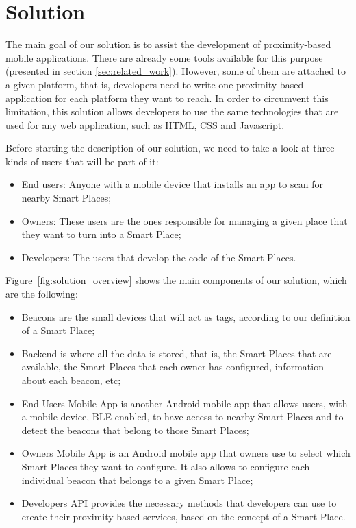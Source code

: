 
\section{Solution}
\label{sec:solution}
The main goal of our solution is to assist
the development of proximity-based mobile applications.
There are already some tools available for this purpose (presented in section \ref{sec:related_work}).
However, some of them are attached to a given platform, that is, developers
need to write one proximity-based application for each platform they want
to reach.
In order to circumvent this limitation, this solution allows developers
to use the same technologies that are used for any web application, such as \gls{HTML}, \gls{CSS} and Javascript.

Before starting the description of our solution, we need to take a look at three kinds of users that will be part of it:
\begin{itemize}
  \item End users: Anyone with a mobile device that installs an app to scan for nearby Smart Places;
  \item Owners: These users are the ones responsible for managing a given place that they want to turn into a Smart Place;
  \item Developers: The users that develop the code of the Smart Places.
\end{itemize}
Figure~\ref{fig:solution_overview} shows the main components of our solution, which are the following:
\begin{itemize}
  \item Beacons
  are the small devices that will act as tags, according to our definition of a Smart Place;
  \item Backend
  is where all the data is stored, that is, the Smart Places that are available, the Smart Places that each owner has configured, information about each beacon, etc;
  \item End Users Mobile App
  is another Android mobile app that allows users, with a mobile device, \gls{BLE} enabled, to have access to nearby Smart Places and to detect the beacons that belong to those Smart Places;
  \item Owners Mobile App
  is an Android mobile app that owners use to select which Smart Places they want to configure. It also allows to configure each individual beacon that belongs to a given Smart Place;
  \item Developers \gls{API} provides the necessary methods that developers can use to create their proximity-based services, based on the concept of a Smart Place.
\end{itemize}

